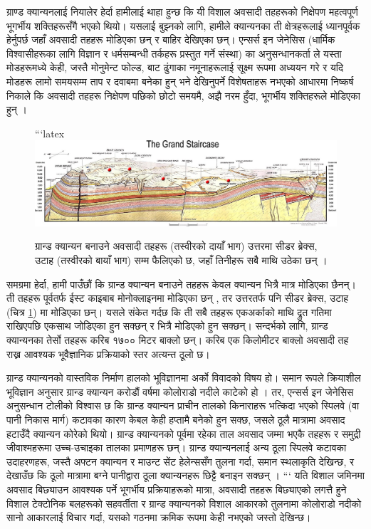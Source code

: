\documentclass[10pt,twocolumn,letterpaper]{article}
\begin{document}
ग्राण्ड क्यान्यनलाई नियालेर हेर्दा हामीलाई थाहा हुन्छ कि यी विशाल अवसादी तहहरूको निक्षेपण महत्वपूर्ण भूगर्भीय शक्तिहरूसँगै भएको थियो। यसलाई बुझ्नको लागि, हामीले क्यान्यनका ती क्षेत्रहरूलाई ध्यानपूर्वक हेर्नुपर्छ जहाँ अवसादी तहहरू मोडिएका छन् र बाहिर देखिएका छन्। एन्सर्स इन जेनेसिस (धार्मिक विश्वासीहरूका लागि विज्ञान र धर्मसम्बन्धी तर्कहरू प्रस्तुत गर्ने संस्था) का अनुसन्धानकर्ता \cite{42} ले यस्ता मोडहरूमध्ये केही, जस्तै मोनुमेन्ट फोल्ड, बाट ढुंगाका नमूनाहरूलाई सूक्ष्म रूपमा अध्ययन गरे र यदि मोडहरू लामो समयसम्म ताप र दवाबमा बनेका हुन् भने देखिनुपर्ने विशेषताहरू नभएको आधारमा निष्कर्ष निकाले कि अवसादी तहहरू निक्षेपण पछिको छोटो समयमै, अझै नरम हुँदा, भूगर्भीय शक्तिहरूले मोडिएका हुन् \cite{43}।

\begin{figure}
\begin{center}
```latex
\includegraphics[width=1\textwidth]{Grand_Staircase-big.jpg}
\end{center}
   \caption{ग्रान्ड क्यान्यन बनाउने अवसादी तहहरू (तस्वीरको दायाँ भाग) उत्तरमा सीडर ब्रेक्स, उटाह (तस्वीरको बायाँ भाग) सम्म फैलिएको छ, जहाँ तिनीहरू सबै माथि उठेका छन् \cite{50}।}
\label{fig:4}
\end{figure}

समग्रमा हेर्दा, हामी पाउँछौं कि ग्रान्ड क्यान्यन बनाउने तहहरू केवल क्यान्यन भित्रै मात्र मोडिएका छैनन्। ती तहहरू पूर्वतर्फ ईस्ट काइबाब मोनोक्लाइनमा मोडिएका छन् \cite{46}, तर उत्तरतर्फ पनि सीडर ब्रेक्स, उटाह (चित्र \ref{fig:4}) मा मोडिएका छन्। यसले संकेत गर्दछ कि ती सबै तहहरू एकअर्काको माथि द्रुत गतिमा राखिएपछि एकसाथ जोडिएका हुन सक्छन् र भित्रै मोडिएको हुन सक्छन्। सन्दर्भको लागि, ग्रान्ड क्यान्यनका तेर्सो तहहरू करिब १७०० मिटर बाक्लो छन्। करिब एक किलोमीटर बाक्लो अवसादी तह राख्न आवश्यक भूवैज्ञानिक प्रक्रियाको स्तर अत्यन्त ठूलो छ।

ग्रान्ड क्यान्यनको वास्तविक निर्माण हालको भूविज्ञानमा अर्को विवादको विषय हो। समान रूपले क्रियाशील भूविज्ञान अनुसार ग्रान्ड क्यान्यन करोडौं वर्षमा कोलोराडो नदीले काटेको हो \cite{47}। तर, एन्सर्स इन जेनेसिस अनुसन्धान टोलीको विश्वास छ कि ग्रान्ड क्यान्यन प्राचीन तालको किनाराहरू भत्किदा भएको स्पिलवे (वा पानी निकास मार्ग) कटावका कारण केबल केही हप्तामै बनेको हुन सक्छ, जसले ठूलै मात्रामा अवसाद हटाउँदै क्यान्यन कोरेको थियो। ग्रान्ड क्यान्यनको पूर्वमा रहेका ताल अवसाद जम्मा भएकै तहहरू र समुद्री जीवाश्महरूमा उच्च-उचाइका तालका प्रमाणहरू छन्। ग्रान्ड क्यान्यनलाई अन्य ठूला स्पिलवे कटावका उदाहरणहरू, जस्तै अफ्टन क्यान्यन र माउन्ट सेंट हेलेन्ससँग तुलना गर्दा, समान स्थलाकृति देखिन्छ, र देखाउँछ कि ठूलो मात्रामा बग्ने पानीद्वारा ठूला क्यान्यनहरू छिट्टै बनाइन सक्छन् \cite{48}।
```
यति विशाल जमिनमा अवसाद बिछ्याउन आवश्यक पर्ने भूगर्भीय प्रक्रियाहरूको मात्रा, अवसादी तहहरू बिछ्याएको लगत्तै हुने विशाल टेक्टोनिक बलहरूको सहवर्तीता र ग्रान्ड क्यान्यनको विशाल आकारको तुलनामा कोलोराडो नदीको सानो आकारलाई विचार गर्दा, यसको गठनमा क्रमिक रूपमा केही नभएको जस्तो देखिन्छ।
\end{document}
